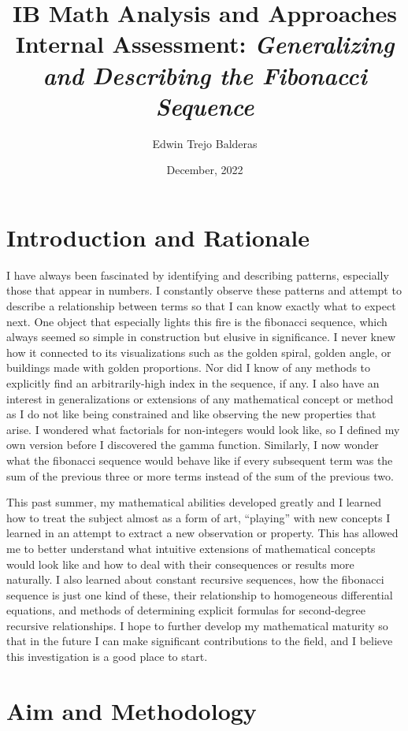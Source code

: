 \documentclass[11pt]{article}
\title{IB Math Analysis and Approaches Internal Assessment: \emph{Generalizing and Describing the Fibonacci Sequence}}
\author{Edwin Trejo Balderas}
\date{December, 2022}
\begin{document}
\singlespacing

\maketitle

\doublespacing

\section{Introduction and Rationale}

I have always been fascinated by identifying and describing patterns, especially those that appear in numbers. I constantly observe these patterns and attempt to describe a relationship between terms so that I can know exactly what to expect next. One object that especially lights this fire is the fibonacci sequence, which always seemed so simple in construction but elusive in significance. I never knew how it connected to its visualizations such as the golden spiral, golden angle, or buildings made with golden proportions. Nor did I know of any methods to explicitly find an arbitrarily-high index in the sequence, if any. I also have an interest in generalizations or extensions of any mathematical concept or method as I do not like being constrained and like observing the new properties that arise. I wondered what factorials for non-integers would look like, so I defined my own version before I discovered the gamma function. Similarly, I now wonder what the fibonacci sequence would behave like if every subsequent term was the sum of the previous three or more terms instead of the sum of the previous two. 

This past summer, my mathematical abilities developed greatly and I learned how to treat the subject almost as a form of art, “playing” with new concepts I learned in an attempt to extract a new observation or property. This has allowed me to better understand what intuitive extensions of mathematical concepts would look like and how to deal with their consequences or results more naturally. I also learned about constant recursive sequences, how the fibonacci sequence is just one kind of these, their relationship to homogeneous differential equations, and methods of determining explicit formulas for second-degree recursive relationships. I hope to further develop my mathematical maturity so that in the future I can make significant contributions to the field, and I believe this investigation is a good place to start.

\section{Aim and Methodology}
\end{document}
